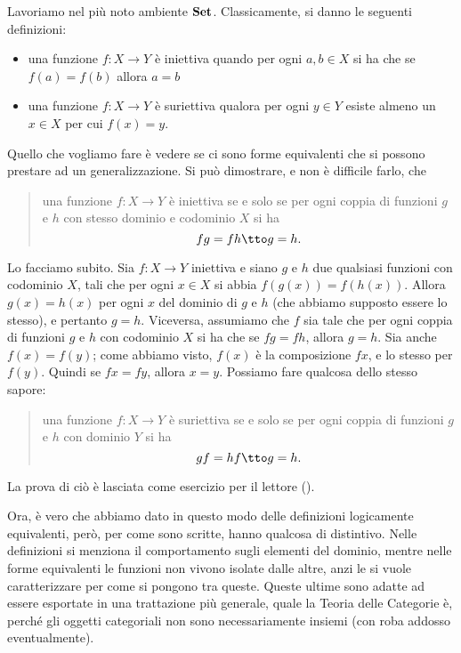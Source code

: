 \begin{esempio}
Lavoriamo nel più noto ambiente \(\mathbf{Set}\). Classicamente, si danno le seguenti definizioni:
\begin{itemize}
\item una funzione \(f : X \to Y\) è iniettiva quando per ogni \(a, b \in X\) si ha che se \(f(a) = f(b)\) allora \(a = b\)
\item una funzione \(f : X \to Y\) è suriettiva qualora per ogni \(y \in Y\) esiste almeno un \(x \in X\) per cui \(f(x) = y\).
\end{itemize}
Quello che vogliamo fare è vedere se ci sono forme equivalenti che si possono prestare ad un generalizzazione. Si può dimostrare, e non è difficile farlo, che
%
\begin{quotation}
una funzione \(f : X \to Y\) è iniettiva se e solo se per ogni coppia di funzioni \(g\) e \(h\) con stesso dominio e codominio \(X\)  si ha
\[fg = fh \tto g = h .\]
\end{quotation}
%
Lo facciamo subito. Sia \(f :  X \to Y\) iniettiva e siano \(g\) e \(h\) due qualsiasi funzioni con codominio \(X\), tali che per ogni \(x \in X\) si abbia \(f(g(x)) = f(h(x))\). Allora \(g(x) = h(x)\) per ogni \(x\) del dominio di \(g\) e \(h\) (che abbiamo supposto essere lo stesso), e pertanto \(g = h\).\newline
Viceversa, assumiamo che \(f\) sia tale che per ogni coppia di funzioni \(g\) e \(h\) con codominio \(X\) si ha che se
\(fg = fh\), allora \(g = h\). Sia anche \(f(x) = f(y)\); come abbiamo visto, \(f(x)\) è la composizione \(f x\), e lo stesso per \(f(y)\). Quindi se \(fx = fy\), allora \(x=y\).\newline
Possiamo fare qualcosa dello stesso sapore:
%
\begin{quotation}
una funzione \(f : X \to Y\) è suriettiva se e solo se per ogni coppia di funzioni \(g\) e \(h\) con dominio \(Y\) si ha
\[gf = hf \tto g = h .\] 
\end{quotation}
%
La prova di ciò è lasciata come esercizio per il lettore (\perlettore).
\end{esempio}

\begin{nota}
Ora, è vero che abbiamo dato in questo modo delle definizioni logicamente equivalenti, però, per come sono scritte, hanno qualcosa di distintivo. Nelle definizioni  si menziona il comportamento sugli elementi del dominio, mentre nelle forme equivalenti le funzioni non vivono isolate dalle altre, anzi le si vuole caratterizzare per come si pongono tra queste. Queste ultime sono adatte ad essere esportate in una trattazione più generale, quale la Teoria delle Categorie è, perché gli oggetti categoriali non sono necessariamente insiemi (con roba addosso eventualmente).
\end{nota}

